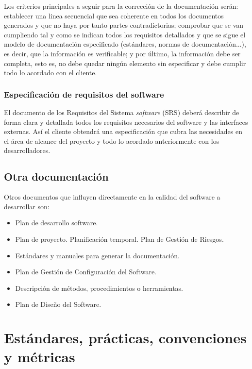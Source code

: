 \documentclass[11pt, a4paper, twoside, titlepage]{article}
\begin{document}
			Los criterios principales a seguir para la corrección de la documentación serán: establecer una linea secuencial que sea
coherente en todos los documentos generados y que no haya por tanto partes contradictorias; comprobar que se van cumpliendo tal y como se indican todos los requisitos detallados y que se sigue el modelo de documentación especificado (estándares, normas de documentación...), es decir, que la información es verificable; y por último, la información debe ser completa, esto es, no debe quedar ningún elemento sin especificar y debe cumplir todo lo acordado con el cliente.
			
				\subsubsection{Especificación de requisitos del software}
					El documento de los Requisitos del Sistema {\itshape software} (SRS) deberá describir de forma clara y detallada todos los requisitos necesarios del software y las interfaces externas. Así el cliente obtendrá una especificación que cubra las necesidades en el área de alcance del proyecto y todo lo acordado anteriormente con los desarrolladores.
		
		\subsection{Otra documentación}
			Otros documentos que influyen directamente en la calidad del software a desarrollar son:

			\begin{itemize}
				\item Plan de desarrollo software.
				\item Plan de proyecto.
					\subitem Planificación temporal.
					\subitem Plan de Gestión de Riesgos.
				\item Estándares y manuales para generar la documentación.
				\item Plan de Gestión de Configuración del Software.
				\item Descripción de métodos, procedimientos o herramientas.
				\item Plan de Diseño del Software.
			\end{itemize}
			
	\section{Estándares, prácticas, convenciones y métricas} %
\end{document}
